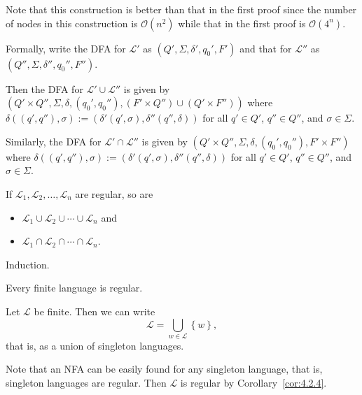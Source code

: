 \documentclass{notes}
\begin{document}
\begin{prf}
  Note that this construction is better than that in the first proof since the number of nodes in this construction is $\mathcal O(n^2)$ while that in the first proof is $\mathcal O(4^n)$.
  
  Formally, write the DFA for $\mathcal L'$ as $(Q', \Sigma, \delta', q_0', F')$ and that for $\mathcal L''$ as $(Q'', \Sigma, \delta'', q_0'', F'')$.
  
  Then the DFA for $\mathcal L' \cup \mathcal L''$ is given by $(Q' \times Q'', \Sigma, \delta, (q_0', q_0''), (F' \times Q'') \cup (Q' \times F''))$ where $\delta((q', q''), \sigma) := (\delta'(q', \sigma), \delta''(q'', \delta))$ for all $q' \in Q'$, $q'' \in Q''$, and $\sigma \in \Sigma$.

  Similarly, the DFA for $\mathcal L' \cap \mathcal L''$ is given by $(Q' \times Q'', \Sigma, \delta, (q_0', q_0''), F' \times F'')$ where $\delta((q', q''), \sigma) := (\delta'(q', \sigma), \delta''(q'', \delta))$ for all $q' \in Q'$, $q'' \in Q''$, and $\sigma \in \Sigma$.
\end{prf}

\begin{cor}
  If $\mathcal L_1, \mathcal L_2, \dots, \mathcal L_n$ are regular, so are 
  \begin{itemize}
    \item $\mathcal L_1 \cup \mathcal L_2 \cup \cdots \cup \mathcal L_n$ and 

    \item $\mathcal L_1 \cap \mathcal L_2 \cap \cdots \cap \mathcal L_n$.
  \end{itemize}
\end{cor}

\begin{prf}
  Induction.
\end{prf}

\begin{cor}
  Every finite language is regular.
\end{cor}

\begin{prf}
  Let $\mathcal L$ be finite.
  Then we can write 
  \[
    \mathcal L = \bigcup_{w \in \mathcal L} \left \{ w \right \}, 
  \]
  that is, as a union of singleton languages.

  Note that an NFA can be easily found for any singleton language, that is, singleton languages are regular.
  Then $\mathcal L$ is regular by Corollary~\ref{cor:4.2.4}.
\end{prf}
\end{document}
